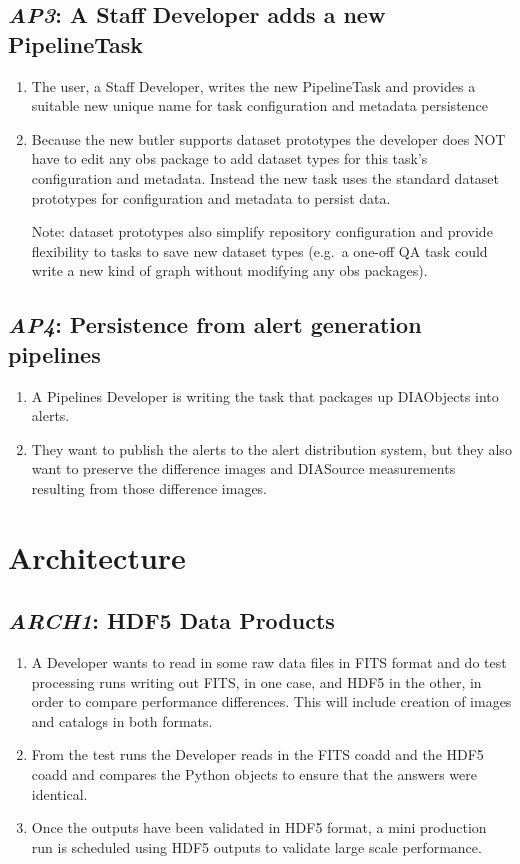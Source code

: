 \documentclass[DM,toc,lsstdraft]{lsstdoc}
\newcommand{\usecase}[3]{%
\subsection{\emph{#1}: #2}
\label{use:#1}
\begin{enumerate}[label=\alph*.]
#3
\end{enumerate}
}
\begin{document}
\usecase{AP3}{A Staff Developer adds a new PipelineTask}{%

\item
The user, a Staff Developer, writes the new PipelineTask and provides a suitable new unique name for task configuration and metadata persistence

\item
Because the new butler supports dataset prototypes the developer does NOT have to edit any obs package to add dataset types for this task's configuration and metadata.
Instead the new task uses the standard dataset prototypes for configuration and metadata to persist data.

Note: dataset prototypes also simplify repository configuration and provide flexibility to tasks to save new dataset types (e.g.\ a one-off QA task could write a new kind of graph without modifying any obs packages).

}

\usecase{AP4}{Persistence from alert generation pipelines}{%

\item
A Pipelines Developer is writing the task that packages up DIAObjects into alerts.

\item
They want to publish the alerts to the alert distribution system, but they also want to preserve the difference images and DIASource measurements resulting from those difference images.

}

\section{Architecture}

\usecase{ARCH1}{HDF5 Data Products}{%

\item
A Developer wants to read in some raw data files in FITS format and do test processing runs writing out FITS, in one case, and HDF5 in the other, in order to compare performance differences.
This will include creation of images and catalogs in both formats.

\item
From the test runs the Developer reads in the FITS coadd and the HDF5 coadd and compares the Python objects to ensure that the answers were identical.

\item
Once the outputs have been validated in HDF5 format, a mini production run is scheduled using HDF5 outputs to validate large scale performance.
}
\end{document}
